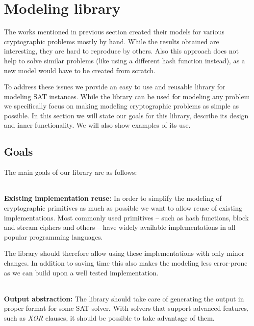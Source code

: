 \section{Modeling library}

The works mentioned in previous section created their models for various cryptographic problems mostly by hand.
While the results obtained are interesting, they are hard to reproduce by others.
Also this approach does not help to solve similar problems (like using a different hash function instead), as a new model would have to be created from scratch.

To address these issues we provide an easy to use and reusable library for modeling SAT instances.
While the library can be used for modeling any problem we specifically focus on making modeling cryptographic problems as simple as possible.
In this section we will state our goals for this library, describe its design and inner functionality.
We will also show examples of its use.

\subsection{Goals}
The main goals of our library are as follows:

~\\
\textbf{Existing implementation reuse:}
In order to simplify the modeling of cryptographic primitives as much as possible we want to allow reuse of existing implementations.
Most commonly used primitives -- such as hash functions, block and stream ciphers and others -- have widely available implementations in all popular programming languages.

The library should therefore allow using these implementations with only minor changes.
In addition to saving time this also makes the modeling less error-prone as we can build upon a well tested implementation.

~\\
\textbf{Output abstraction:}
The library should take care of generating the output in proper format for some SAT solver.
With solvers that support advanced features, such as \emph{XOR} clauses, it should be possible to take advantage of them.

